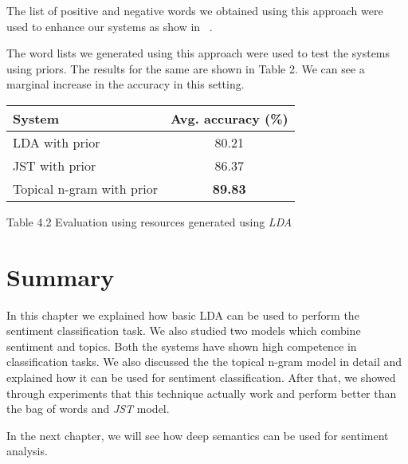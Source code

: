The list of positive and negative words we obtained using this approach were used to enhance our systems as show in ~.

The word lists we generated using this approach were used to test the systems using priors. The results for the same
are shown in Table 2. We can see a marginal increase in the accuracy in this setting.

\begin{center}
\begin{tabular}{|l|c|}
\hline \bf System & \bf Avg. accuracy (\%)\\ \hline
LDA with prior & 80.21\\
JST with prior & 86.37\\
Topical n-gram with prior & \textbf{89.83}\\
\hline
\end{tabular}
\end{center}
\begin{center}
 Table 4.2 Evaluation using resources generated using \textit{LDA}
\end{center}


\section*{Summary}
In this chapter we explained how basic LDA can be used to perform the sentiment classification task. We also studied two models which combine sentiment
and topics. Both the systems have shown high competence in classification tasks. We also discussed the the topical n-gram model in detail and explained 
how it can be used for sentiment classification. After that, we showed through experiments that this technique actually work and perform better than the
bag of words and \textit{JST} model. 

In the next chapter, we will see how deep semantics can be used for sentiment analysis.

\clearpage